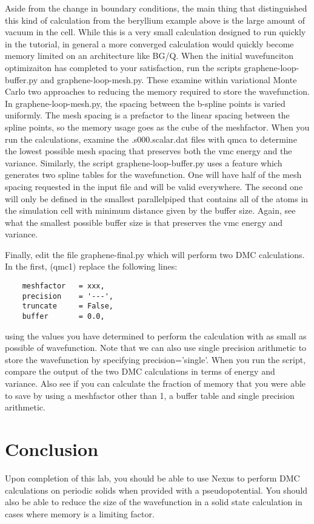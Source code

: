 Aside from the change in boundary conditions, the main thing that distinguished this kind of calculation from the beryllium example above is the large amount of vacuum in the cell.  While this is a very small calculation designed to run quickly in the tutorial, in general a more converged calculation would quickly become memory limited on an architecture like BG/Q.  When the initial wavefunciton optimizaiton has completed to your satisfaction, run the scripts graphene-loop-buffer.py and graphene-loop-mesh.py.  These examine within variational Monte Carlo two approaches to reducing the memory required to store the wavefunction.  In graphene-loop-mesh.py, the spacing between the b-spline points is varied uniformly.  The mesh spacing is a prefactor to the linear spacing between the spline points, so the memory usage goes as the cube of the meshfactor.  When you run the calculations, examine the .s000.scalar.dat files with qmca to determine the lowest possible mesh spacing that preserves both the vmc energy and the variance.  Similarly, the script graphene-loop-buffer.py uses a feature which generates two spline tables for the wavefunction.  One will have half of the mesh spacing requested in the input file and will be valid everywhere.  The second one will only be defined in the smallest parallelpiped that contains all of the atoms in the simulation cell with minimum distance given by the buffer size.  Again, see what the smallest possible buffer size is that preserves the vmc energy and variance.

Finally, edit the file graphene-final.py which will perform two DMC calculations.  In the first, (qmc1) replace the following lines:
\begin{shaded}
\begin{verbatim}
    meshfactor   = xxx,
    precision    = '---',
    truncate     = False,
    buffer       = 0.0,
\end{verbatim}
\end{shaded}
using the values you have determined to perform the calculation with as small as possible of wavefunction.  Note that we can also use single precision arithmetic to store the wavefunction by specifying precision='single'.  When you run the script, compare the output of the two DMC calculations in terms of energy and variance.  Also see if you can calculate the fraction of memory that you were able to save by using a meshfactor other than 1, a buffer table and single precision arithmetic.

\section{Conclusion}
Upon completion of this lab, you should be able to use Nexus to perform DMC calculations on periodic solids when provided with a pseudopotential.  You should also be able to reduce the size of the wavefunction in a solid state calculation in cases where memory is a limiting factor.

